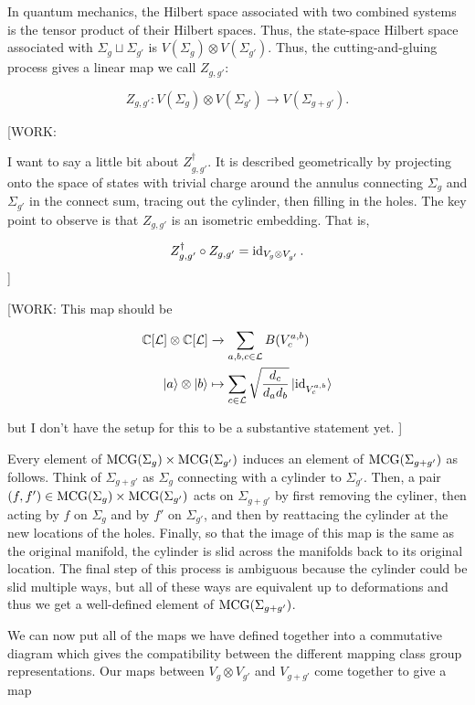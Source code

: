 In quantum mechanics, the Hilbert space associated with two combined systems is the tensor product of their Hilbert spaces. Thus, the state-space Hilbert space associated with $\Sigma_{g}\sqcup\Sigma_{g'}$ is $V(\Sigma_{g})\otimes V(\Sigma_{g'})$. Thus, the cutting-and-gluing process gives a linear map we call $Z_{g,g'}$:

$$Z_{g,g'}:V(\Sigma_{g})\otimes V(\Sigma_{g'})\xrightarrow{} V(\Sigma_{g+g'}).$$

[WORK:

I want to say a little bit about $Z_{g,g'}^\dagger$. It is described geometrically by projecting onto the space of states with trivial charge around the annulus connecting $\Sigma_{g}$ and $\Sigma_{g'}$ in the connect sum, tracing out the cylinder, then filling in the holes. The key point to observe is that $Z_{g,g'}$ is an isometric embedding. That is,

$$Z_{g,g'}^\dagger \circ Z_{g,g'}=\operatorname{id}_{V_{g}\otimes V_{g'}}.$$
]


[WORK: This map should be

\begin{align*}
{\mathbb C}[{\mathcal L}]\otimes {\mathbb C}[{\mathcal L}]&\xrightarrow{}\sum_{a,b,c\in {\mathcal L}}B(V^{a,b}_c)\\
\ket{a}\otimes \ket{b}&\mapsto \sum_{c\in {\mathcal L}}\sqrt{\frac{d_c}{d_ad_b}}\ket{\operatorname{id}_{V^{a,b}_c}}
\end{align*}

but I don't have the setup for this to be a substantive statement yet.
]

Every element of $\operatorname{MCG}(\Sigma_g)\times \operatorname{MCG}(\Sigma_{g'})$ induces an element of $\operatorname{MCG}(\Sigma_{g+g'})$ as follows. Think of $\Sigma_{g+g'}$ as $\Sigma_{g}$ connecting with a cylinder to $\Sigma_{g'}$. Then, a pair $(f,f')\in \operatorname{MCG}(\Sigma_g)\times \operatorname{MCG}(\Sigma_{g'})$ acts on $\Sigma_{g+g'}$ by first removing the cyliner, then acting by $f$ on $\Sigma_{g}$ and by $f'$ on $\Sigma_{g'}$, and then by reattacing the cylinder at the new locations of the holes. Finally, so that the image of this map is the same as the original manifold, the cylinder is slid across the manifolds back to its original location. The final step of this process is ambiguous because the cylinder could be slid multiple ways, but all of these ways are equivalent up to deformations and thus we get a well-defined element of $\operatorname{MCG}(\Sigma_{g+g'})$.

We can now put all of the maps we have defined together into a commutative diagram which gives the compatibility between the different mapping class group representations. Our maps between $V_{g}\otimes V_{g'}$ and $V_{g+g'}$ come together to give a map

